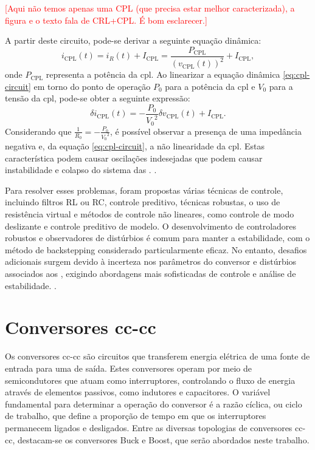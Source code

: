 \textcolor{red}{[Aqui não temos apenas uma CPL (que precisa estar melhor caracterizada), a figura e o texto fala de CRL+CPL. É bom esclarecer.]}

\noindent A partir deste circuito, pode-se derivar a seguinte equação dinâmica: \begin{equation} i_{\text{CPL}}(t) = i_R(t) + I_{\text{CPL}} = \frac{P_{\text{CPL}}}{(v_{\text{CPL}}(t))^2} + I_{\text{CPL}} \label{eq:cpl-circuit},\end{equation} onde $P_{\text{CPL}}$ representa a potência da \acrshort{cpl}. Ao linearizar a equação dinâmica \eqref{eq:cpl-circuit} em torno do ponto de operação $P_0$ para a potência da \acrshort{cpl} e $V_0$ para a tensão da \acrshort{cpl}, pode-se obter a seguinte expressão: \begin{equation} \delta i_{\text{CPL}}(t) = - \frac{P_0}{{V_0}^2}\delta v_{\text{CPL}}(t) + I_{\text{CPL}}. \end{equation} Considerando que $\frac{1}{R_0} = - \frac{P_0}{{V_0}^2}$, é possível observar a presença de uma impedância negativa e, da equação \eqref{eq:cpl-circuit}, a não linearidade da \acrshort{cpl}. Estas característica podem causar oscilações indesejadas que podem causar instabilidade e colapso do sistema das . \cite{Bessa2020, Amiri2020}.

Para resolver esses problemas, foram propostas várias técnicas de controle, incluindo filtros RL ou RC, controle preditivo, técnicas robustas, o uso de resistência virtual e métodos de controle não lineares, como controle de modo deslizante e controle preditivo de modelo. O desenvolvimento de controladores robustos e observadores de distúrbios é comum para manter a estabilidade, com o método de backstepping considerado particularmente eficaz. No entanto, desafios adicionais surgem devido à incerteza nos parâmetros do conversor e distúrbios associados aos , exigindo abordagens mais sofisticadas de controle e análise de estabilidade. \cite{Bessa2020, Amiri2020}.

\section{Conversores \acrshort{cc}-\acrshort{cc}}

Os conversores \acrshort{cc}-\acrshort{cc} são circuitos que transferem energia elétrica de uma fonte de entrada para uma de saída. Estes conversores operam por meio de semicondutores que atuam como interruptores, controlando o fluxo de energia através de elementos passivos, como indutores e capacitores. O variável fundamental para determinar a operação do conversor é a razão cíclica, ou ciclo de trabalho, que define a proporção de tempo em que os interruptores permanecem ligados e desligados. Entre as diversas topologias de conversores \acrshort{cc}-\acrshort{cc}, destacam-se os conversores Buck e Boost, que serão abordados neste trabalho.

